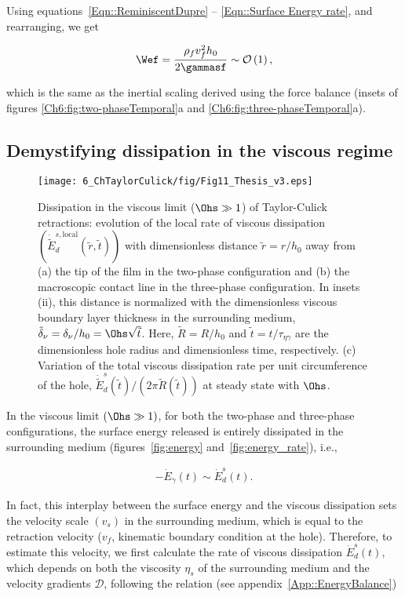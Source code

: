 \noindent Using equations~\eqref{Eqn::ReminiscentDupre} -- \eqref{Eqn::Surface Energy rate}, and rearranging, we get

\begin{align}
	\Wef = \frac{\rho_fv_f^2h_0}{2\gammasf} \sim \mathcal{O}\left(1\right),
\end{align}

\noindent which is the same as the inertial scaling derived using the force balance (insets of figures \ref{Ch6:fig:two-phaseTemporal}a and \ref{Ch6:fig:three-phaseTemporal}a).

\subsection{Demystifying dissipation in the viscous regime}\label{sec:energetics viscous}
\begin{sidewaysfigure}
	\centering
	\texttt{[image: 6\_ChTaylorCulick/fig/Fig11\_Thesis\_v3.eps]}
	\caption{Dissipation in the viscous limit ($\Ohs \gg 1$) of Taylor-Culick retractions: evolution of the local rate of viscous dissipation $\left(\dot{\tilde{E}}_d^{s, \text{local}}\left(\tilde{r}, \tilde{t}\right)\right)$ with dimensionless distance $\tilde{r} = r/h_0$ away from (a) the tip of the film in the two-phase configuration and (b) the macroscopic contact line in the three-phase configuration. In insets (ii), this distance is normalized with the dimensionless viscous boundary layer thickness in the surrounding medium, $\tilde{\delta}_\nu = \delta_\nu/h_0 = \Ohs\sqrt{\tilde{t}}$. Here, $\tilde{R} = R/h_0$ and $\tilde{t} = t/\tau_{\eta\gamma}$ are the dimensionless hole radius and dimensionless time, respectively. (c) Variation of the total viscous dissipation rate per unit circumference of the hole, $\dot{\tilde{E}}_d^{s}\left(\tilde{t}\right)/(2\pi\tilde{R}\left(\tilde{t}\right))$ at steady state with $\Ohs$.}
	\label{fig:dissipation}
\end{sidewaysfigure}

In the viscous limit $\left(\Ohs \gg 1\right)$, for both the two-phase and three-phase configurations, the surface energy released is entirely dissipated in the surrounding medium (figures~\ref{fig:energy} and~\ref{fig:energy_rate}), i.e.,

\begin{align}
	-\dot{E}_\gamma(t) \sim \dot{E}_d^{s}(t).
	\label{Eqn::Viscous energy balance}
\end{align}

\noindent In fact, this interplay between the surface energy and the viscous dissipation sets the velocity scale $\left(v_s\right)$ in the surrounding medium, which is equal to the retraction velocity ($v_f$, kinematic boundary condition at the hole). Therefore, to estimate this velocity, we first calculate the rate of viscous dissipation $\dot{E}_d^{s}(t)$, which depends on both the viscosity $\eta_{s}$ of the surrounding medium and the velocity gradients $\boldsymbol{\mathcal{D}}$, following the relation (see appendix~\ref{App::EnergyBalance})

